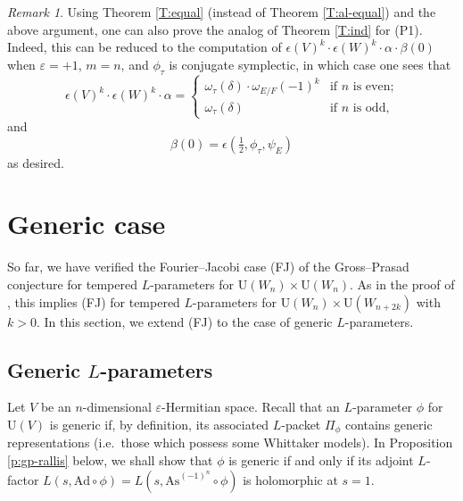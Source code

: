 \documentclass[11pt]{amsart}
\numberwithin{equation}{section}
\theoremstyle{plain}
\theoremstyle{definition}
\theoremstyle{remark}
\newtheorem{rem}[thm]{Remark}
\def\Ad{\mathrm{Ad}}
\def\As{\mathrm{As}}
\def\U{\mathrm{U}}
\begin{document}
\begin{rem}
Using Theorem \ref{T:equal} (instead of Theorem \ref{T:al-equal}) and the above argument, one can also prove the analog of Theorem \ref{T:ind} for (P1).
Indeed, this can be reduced to the computation of $\epsilon(V)^k \cdot \epsilon(W)^k \cdot \alpha \cdot \beta(0)$
when $\varepsilon = +1$, $m=n$, and $\phi_\tau$ is conjugate symplectic,
in which case one sees that 
\[
 \epsilon(V)^k \cdot \epsilon(W)^k \cdot \alpha = 
 \begin{cases}
  \omega_{\tau}(\delta) \cdot \omega_{E/F}(-1)^k & \text{if $n$ is even;} \\
  \omega_{\tau}(\delta) & \text{if $n$ is odd,}
 \end{cases}
\]
and 
\[
 \beta(0) = \epsilon(\tfrac{1}{2}, \phi_\tau, \psi_E)
\]
as desired.
\end{rem}

\section{\textbf{Generic case}}
\label{s:generic}

So far, we have verified the Fourier--Jacobi case (FJ) of the Gross--Prasad conjecture for tempered $L$-parameters for $\U(W_n) \times \U(W_n)$.
As in the proof of \cite[Theorem 19.1]{ggp1}, this implies (FJ) for tempered $L$-parameters for $\U(W_n) \times \U(W_{n+2k})$ with $k>0$.
In this section, we extend (FJ) to the case of generic $L$-parameters.

\subsection{Generic $L$-parameters}

Let $V$ be an $n$-dimensional $\varepsilon$-Hermitian space.
Recall that an $L$-parameter $\phi$ for $\U(V)$ is generic if, by definition, its associated $L$-packet $\Pi_{\phi}$ contains generic representations (i.e.~those which possess some Whittaker models).
In Proposition \ref{p:gp-rallis} below, we shall show that $\phi$ is generic if and only if its adjoint $L$-factor $L(s, \Ad \circ \phi) =  L(s, \As^{(-1)^n} \circ \phi)$ is holomorphic at $s=1$.
\end{document}
